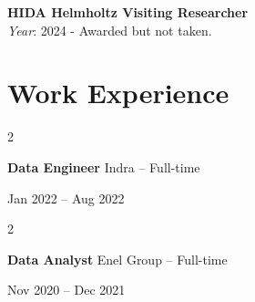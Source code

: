 \documentclass[10pt, letterpaper]{article}
\newenvironment{highlights}{
    \begin{itemize}[
        topsep=0.10 cm,
        parsep=0.10 cm,
        partopsep=0pt,
        itemsep=0pt,
        leftmargin=0 cm + 10pt
    ]
}{
    \end{itemize}
} %
\newenvironment{twocolentry}[2][]{
    \onecolentry
    \def\secondColumn{#2}
    \setcolumnwidth{\fill, 4.5 cm}
    \begin{paracol}{2}
}{
    \switchcolumn \raggedleft \secondColumn
    \end{paracol}
    \endonecolentry
} %
\begin{document}
        \vspace{0.1em} %
        
        \noindent \textbf{HIDA Helmholtz Visiting Researcher} \\
        \textit{Year}: 2024 - Awarded but not taken.

        
\section*{\small Work Experience}

\begin{twocolentry}{Jan 2022 – Aug 2022}
    \textbf{Data Engineer} \textbar Indra – Full-time
\end{twocolentry}


\begin{twocolentry}{Nov 2020 – Dec 2021}
    \textbf{Data Analyst} \textbar Enel Group – Full-time
\end{twocolentry}
\end{document}
